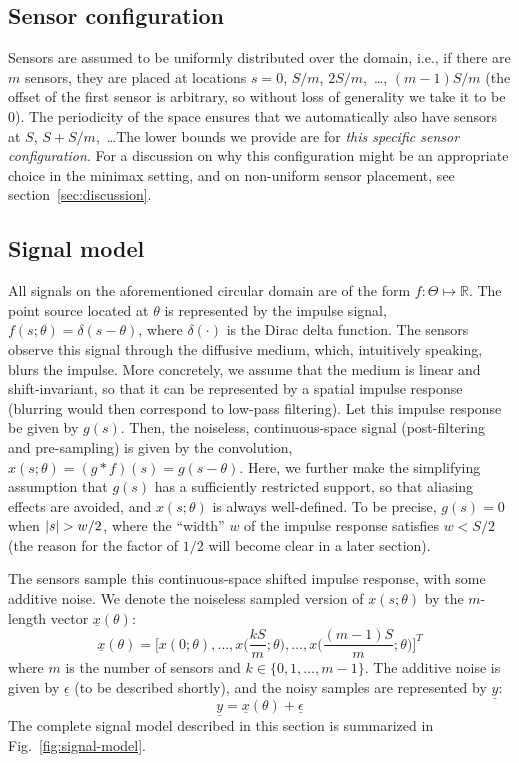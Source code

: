 \documentclass[conference]{IEEEtran}
\providecommand{\v}{}
\renewcommand{\v}[1]{\underline{#1}}
\DeclarePairedDelimiter\abs{\lvert}{\rvert}
\begin{document}
\subsection{Sensor configuration}

Sensors are assumed to be uniformly distributed over the domain, i.e., if there
are $m$ sensors, they are placed at locations $s = 0$, $S/m$, $2S/m$,~\dots,
$(m{-}1)S/m$ (the offset of the first sensor is arbitrary, so without loss of
generality we take it to be 0). The periodicity of the space ensures that we
automatically also have sensors at $S$, $S{+}S/m$,~\dots\@ The lower bounds we
provide are for \emph{this specific sensor configuration}. For a discussion on
why this configuration might be an appropriate choice in the minimax setting,
and on non-uniform sensor placement, see section~\ref{sec:discussion}.

\subsection{Signal model}
\label{sec:signal-model}

All signals on the aforementioned circular domain are of the form
$f:\Theta\mapsto\mathbb{R}$.  The point source located at $\theta$ is
represented by the impulse signal, $f(s;\theta) = \delta(s - \theta)$, where
$\delta(\cdot)$ is the Dirac delta function.  The sensors observe this signal
through the diffusive medium, which, intuitively speaking, blurs the impulse.
More concretely, we assume that the medium is linear and shift-invariant, so
that it can be represented by a spatial impulse response (blurring would then
correspond to low-pass filtering). Let this impulse response be given by
$g(s)$. Then, the noiseless, continuous-space signal (post-filtering and
pre-sampling) is given by the convolution, $x(s; \theta) = (g*f)(s) = g(s -
\theta)$. Here, we further make the simplifying assumption that $g(s)$ has a
sufficiently restricted support, so that aliasing effects are avoided, and
$x(s; \theta)$ is always well-defined. To be precise, $g(s) = 0$ when $\abs{s}
> w/2$, where the ``width'' $w$ of the impulse response satisfies $w < S / 2$
(the reason for the factor of $1/2$ will become clear in a later section).

The sensors sample this continuous-space shifted impulse response, with some
additive noise. We denote the noiseless sampled version of $x(s; \theta)$ by
the $m$-length vector $\v x(\theta)$:
\begin{equation} \label{eq:sampled-signal}
	\v x(\theta) = \bigg[x(0; \theta), \ldots, x\Big(\frac{kS}{m}; \theta\Big), \ldots, x\Big(\frac{(m-1)S}{m}; \theta\Big)\bigg]^T
\end{equation}
where $m$ is the number of sensors and $k \in \{0, 1, \ldots, m-1\}$. The
additive noise is given by $\v \epsilon$ (to be described shortly), and the
noisy samples are represented by $\v y$:
\begin{equation} \label{eq:sensor-obs}
	\v y = \v x(\theta) + \v \epsilon
\end{equation}
The complete signal model described in this section is summarized in
Fig.~\ref{fig:signal-model}.
\end{document}
